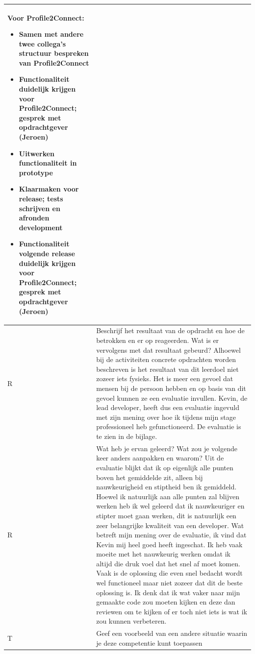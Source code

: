 \begin{tabularx}{\textwidth}{| l | X |}
Voor Profile2Connect:
\begin{itemize}
\item Samen met andere twee collega's structuur bespreken van Profile2Connect
\item Functionaliteit duidelijk krijgen voor Profile2Connect; gesprek met opdrachtgever (Jeroen)
\item Uitwerken functionaliteit in prototype
\item Klaarmaken voor release; tests schrijven en afronden development
\item Functionaliteit volgende release duidelijk krijgen voor Profile2Connect; gesprek met opdrachtgever (Jeroen)
\end{itemize}
\\
\hline
R & Beschrijf het resultaat van de opdracht en hoe de betrokken en er op reageerden. Wat is er vervolgens met dat resultaat gebeurd?
\newline
\newline
Alhoewel bij de activiteiten concrete opdrachten worden beschreven is het resultaat van dit leerdoel niet zozeer iets fysieks. Het is meer een gevoel dat mensen bij de persoon hebben en op basis van dit gevoel kunnen ze een evaluatie invullen.
Kevin, de lead developer, heeft dus een evaluatie ingevuld met zijn mening over hoe ik tijdens mijn stage professioneel heb gefunctioneerd. De evaluatie is te zien in de bijlage.
\\
\hline
R & Wat heb je ervan geleerd? Wat zou je volgende keer anders aanpakken en waarom?
\newline
\newline
Uit de evaluatie blijkt dat ik op eigenlijk alle punten boven het gemiddelde zit, alleen bij nauwkeurigheid en stiptheid ben ik gemiddeld. Hoewel ik natuurlijk aan alle punten zal blijven werken heb ik wel geleerd dat ik nauwkeuriger en stipter moet gaan werken, dit is natuurlijk een zeer belangrijke kwaliteit van een developer. Wat betreft mijn mening over de evaluatie, ik vind dat Kevin mij heel goed heeft ingeschat. Ik heb vaak moeite met het nauwkeurig werken omdat ik altijd die druk voel dat het snel af moet komen. Vaak is de oplossing die even snel bedacht wordt wel functioneel maar niet zozeer dat dit de beste oplossing is. Ik denk dat ik wat vaker naar mijn gemaakte code zou moeten kijken en deze dan reviewen om te kijken of er toch niet iets is wat ik zou kunnen verbeteren.
\\
\hline
T & Geef een voorbeeld van een andere situatie waarin je deze competentie kunt toepassen

\end{tabularx}
